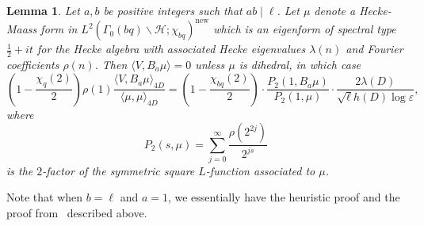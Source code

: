 \documentclass[11pt,reqno,oneside]{amsart}
\theoremstyle{plain}
\newtheorem{lemma}[theorem]{Lemma}
\theoremstyle{definition}
\DeclareMathOperator{\new}{new}
\newcommand{\Szero}[2]{L^2(\Gamma_0(#1)\backslash\mathcal{H}; #2)}
\begin{document}
\begin{lemma}\label{lem:old_form_inner}
  Let $a,b$ be positive integers such that $ab \mid \ell$.
  Let $\mu$ denote a Hecke-Maass form in $\Szero{bq}{\chi_{bq}}^{\new}$ which is an
  eigenform of spectral type $\tfrac{1}{2}+it$ for the Hecke algebra with associated Hecke eigenvalues $\lambda(n)$
  and Fourier coefficients $\rho(n)$. Then $\langle V, B_a \mu \rangle = 0$ unless $\mu$ is dihedral, in which case
  \begin{equation}
    \left(1 - \frac{\chi_q(2)}{2} \right) \rho(1) \frac{\langle V, B_a \mu
      \rangle_{4D}}{\langle \mu, \mu \rangle_{4D}}
    = \left(1 - \frac{\chi_{bq}(2)}{2} \right) \cdot \frac{P_2(1,B_a \mu)}{P_2(1, \mu)} \cdot
    \frac{ 2 \lambda(D)}{ \sqrt{\ell} h(D) \log \varepsilon},
  \end{equation}
  where
  \[
    P_2(s, \mu) = \sum_{j=0}^{\infty} \frac{\rho(2^{2j})}{2^{js}}
  \]
  is the $2$-factor of the symmetric square $L$-function associated to $\mu$.
\end{lemma}

Note that when $b = \ell$ and $a = 1$, we essentially have the heuristic proof
and the proof from~\cite{hkldw_3aps} described above.
\end{document}
